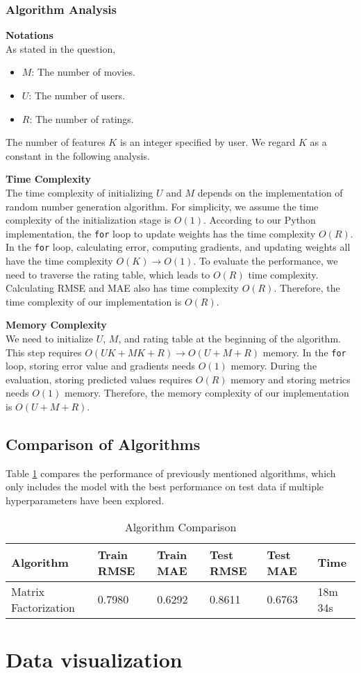 \documentclass[12pt]{article}
\begin{document}
\subsubsection{Algorithm Analysis}
\noindent\textbf{Notations}\\
As stated in the question,
\begin{itemize}
    \item $M$: The number of movies.
    \item $U$: The number of users.
    \item $R$: The number of ratings.
\end{itemize}
The number of features $K$ is an integer specified by user. We regard $K$ as a constant in the following analysis.\par
\vspace{0.3cm}
\noindent\textbf{Time Complexity}\\
The time complexity of initializing $U$ and $M$ depends on the implementation of random number generation algorithm. For simplicity, we assume the time complexity of the initialization stage is $O(1)$. According to our Python implementation, the \texttt{for} loop to update weights has the time complexity $O(R)$. In the \texttt{for} loop, calculating error, computing gradients, and updating weights all have the time complexity $O(K) \rightarrow O(1)$. To evaluate the performance, we need to traverse the rating table, which leads to $O(R)$ time complexity. Calculating RMSE and MAE also has time complexity $O(R)$. Therefore, the time complexity of our implementation is $O(R)$.\par 
\vspace{0.3cm}
\noindent\textbf{Memory Complexity}\\
We need to initialize $U$, $M$, and rating table at the beginning of the algorithm. This step requires $O(UK + MK + R)\rightarrow O(U + M + R)$ memory. In the \texttt{for} loop, storing error value and gradients needs $O(1)$ memory. During the evaluation, storing predicted values requires $O(R)$ memory and storing metrics needs $O(1)$ memory. Therefore, the memory complexity of our implementation is $O(U + M + R)$.

\subsection{Comparison of Algorithms}
Table \ref{tab:1.4} compares the performance of previously mentioned algorithms, which only includes the model with the best performance on test data if multiple hyperparameters have been explored.
\begin{table}[ht]
    \centering
    \caption{Algorithm Comparison}
    \label{tab:1.4}
    \begin{tabular}{llllll}
        \toprule
        \textbf{Algorithm} & \textbf{Train RMSE} & \textbf{Train MAE} & \textbf{Test RMSE} & \textbf{Test MAE} & \textbf{Time}\\
        \midrule
        Matrix Factorization & 0.7980 & 0.6292 & 0.8611 & 0.6763 & 18m 34s\\

        \bottomrule
    \end{tabular}
\end{table}
\section{Data visualization}
\end{document}
